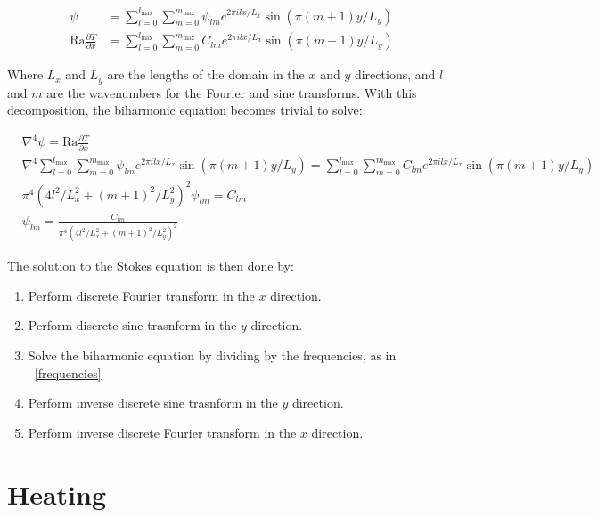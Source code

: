 \documentclass[a4paper,10pt]{article}
\begin{document}
\begin{equation}
\begin{aligned}
\psi &= \displaystyle \sum_{l=0}^{l_{\mathrm{max}}} \sum_{m=0}^{m_{\mathrm{max}}} \psi_{lm}  e^{2 \pi i l x / L_x} \sin( \pi (m+1) y/ L_y)  \\
\mathrm{Ra} \frac{\partial T}{\partial x} &= \displaystyle \sum_{l=0}^{l_{\mathrm{max}}} \sum_{m=0}^{m_{\mathrm{max}}} C_{lm}  e^{2 \pi i l x /L_x} \sin( \pi (m+1) y/ L_y) 
\end{aligned}
\end{equation}

Where $L_x$ and $L_y$ are the lengths of the domain in the $x$ and $y$ directions, and $l$ and $m$ are the wavenumbers for the Fourier and sine transforms.
With this decomposition, the biharmonic equation becomes trivial to solve:

\begin{equation}
\begin{aligned}
 &\nabla^4 \psi = \mathrm{Ra} \frac{\partial{T}}{\partial x} \\
 &\nabla^4 \displaystyle \sum_{l=0}^{l_{\mathrm{max}}} \sum_{m=0}^{m_{\mathrm{max}}} \psi_{lm}  e^{2 \pi i l x/L_x} \sin( \pi (m+1) y/L_y)  =
 \displaystyle \sum_{l=0}^{l_{\mathrm{max}}} \sum_{m=0}^{m_{\mathrm{max}}} C_{lm}  e^{2 \pi i l x/L_x} \sin( \pi (m+1) y/L_y)  \\
 &{\pi^4\left(4 l^2/L_x^2 + (m+1)^2 / L_y^2 \right)^2} \psi_{lm} = C_{lm} \\
 &\psi_{lm} =  \frac{C_{lm} }{\pi^4\left(4 l^2/L_x^2 +(m+1)^2 / L_y^2 \right)^2}
\end{aligned}
\label{frequencies}
\end{equation}

The solution to the Stokes equation is then done by:
\begin{enumerate}
\item Perform discrete Fourier transform in the $x$ direction.
\item Perform discrete sine trasnform in the $y$ direction.
\item Solve the biharmonic equation by dividing by the frequencies, as in ~\ref{frequencies}
\item Perform inverse discrete sine trasnform in the $y$ direction.
\item Perform inverse discrete Fourier transform in the $x$ direction.
\end{enumerate}


\section{Heating}
\end{document}
